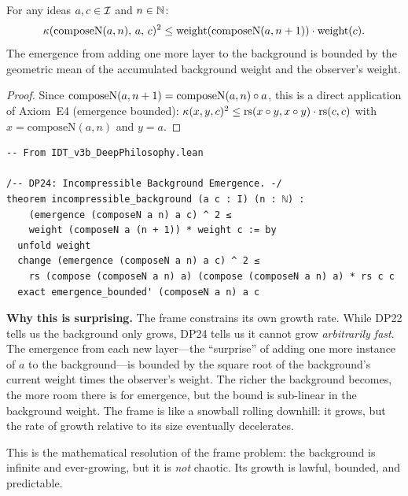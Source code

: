 \begin{theorem}
\label{thm:incompressible-background}
For any ideas $a, c \in \mathcal{I}$ and $n \in \mathbb{N}$:
\[
\kappa(\mathrm{composeN}(a,n),\, a,\, c)^2 \leq
\mathrm{weight}(\mathrm{composeN}(a, n+1)) \cdot \mathrm{weight}(c).
\]
The emergence from adding one more layer to the background is bounded by
the geometric mean of the accumulated background weight and the
observer's weight.
\end{theorem}

\begin{proof}
Since $\mathrm{composeN}(a,n+1) = \mathrm{composeN}(a,n) \circ a$,
this is a direct application of Axiom~E4 (emergence bounded):
$\kappa(x, y, c)^2 \leq \mathrm{rs}(x \circ y, x \circ y) \cdot \mathrm{rs}(c, c)$
with $x = \mathrm{composeN}(a,n)$ and $y = a$.
\end{proof}

\begin{lstlisting}
-- From IDT_v3b_DeepPhilosophy.lean

/-- DP24: Incompressible Background Emergence. -/
theorem incompressible_background (a c : I) (n : ℕ) :
    (emergence (composeN a n) a c) ^ 2 ≤
    weight (composeN a (n + 1)) * weight c := by
  unfold weight
  change (emergence (composeN a n) a c) ^ 2 ≤
    rs (compose (composeN a n) a) (compose (composeN a n) a) * rs c c
  exact emergence_bounded' (composeN a n) a c
\end{lstlisting}

\begin{surprisebox}
\noindent\textbf{Why this is surprising.}
The frame constrains its own growth rate.  While DP22 tells us the
background only grows, DP24 tells us it cannot grow \emph{arbitrarily
fast}.  The emergence from each new layer---the ``surprise'' of
adding one more instance of $a$ to the background---is bounded by the
square root of the background's current weight times the observer's
weight.  The richer the background becomes, the more room there is
for emergence, but the bound is sub-linear in the background weight.
The frame is like a snowball rolling downhill: it grows, but the
rate of growth relative to its size eventually decelerates.

This is the mathematical resolution of the frame problem: the
background is infinite and ever-growing, but it is \emph{not}
chaotic.  Its growth is lawful, bounded, and predictable.
\end{surprisebox}

